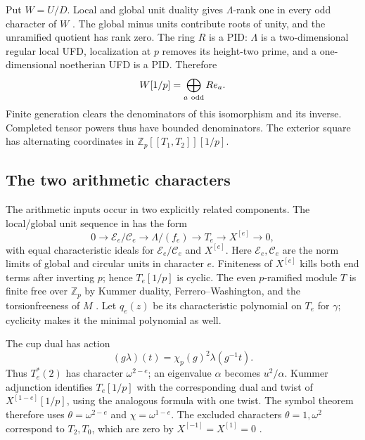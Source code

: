 \documentclass[11pt]{article}
\theoremstyle{definition}\newtheorem{definition}[theorem]{Definition}
\newcommand{\Z}{\mathbb Z}\newcommand{\Q}{\mathbb Q}
\begin{document}
Put $W=U/D$. Local and global unit duality gives $\Lambda$-rank
one in every odd character of $W$
\cite[Proposition~2.2.6 and its proof, pp.~3--4]{WWEOrd}.
The global minus units contribute roots of unity, and the
unramified quotient has rank zero. The ring $R$ is a PID:
$\Lambda$ is a two-dimensional regular local UFD, localization
at $p$ removes its height-two prime, and a one-dimensional
noetherian UFD is a PID. Therefore
\begin{equation}
                  W[1/p]=\bigoplus_{a\ {\rm odd}}Re_a .
                  \label{eq:Wfree}
\end{equation}
Finite generation clears the denominators of this isomorphism
and its inverse. Completed tensor powers thus have bounded
denominators. The exterior square has alternating coordinates
in $\Z_p[[T_1,T_2]][1/p]$.

\subsection{The two arithmetic characters}

The arithmetic inputs occur in two explicitly related components.
The local/global unit sequence in
\cite[Corollary~2.1.3, p.~8]{WWEPseudo} has the form
\begin{equation}
 0\longrightarrow\mathcal E_e/\mathcal C_e
 \longrightarrow\Lambda/(f_e)\longrightarrow T_e
 \longrightarrow X^{[e]}\longrightarrow0 ,
 \label{eq:unitseq}
\end{equation}
with equal characteristic ideals for $\mathcal E_e/\mathcal C_e$
and $X^{[e]}$. Here $\mathcal E_e,\mathcal C_e$ are the norm limits
of global and circular units in character $e$.
Finiteness of $X^{[e]}$ kills both end terms after inverting $p$;
hence $T_e[1/p]$ is cyclic.
The even $p$-ramified module $T$ is finite free over $\Z_p$ by
Kummer duality, Ferrero--Washington, and the torsionfreeness of $M$
\cite[Proposition~3.4.7 and Corollary~3.4.8, p.~92]{SharifiIwa}.
Let $q_e(z)$ be its characteristic polynomial on $T_e$ for
$\gamma$; cyclicity makes it the minimal polynomial as well.

The cup dual has action
\begin{equation}
 (g\lambda)(t)=\chi_p(g)^2\lambda(g^{-1}t).
 \label{eq:twodual}
\end{equation}
Thus $T_e^*(2)$ has character $\omega^{2-e}$; an eigenvalue
$\alpha$ becomes $u^2/\alpha$. Kummer adjunction identifies
$T_e[1/p]$ with the corresponding dual and twist of
$X^{[1-e]}[1/p]$, using the analogous formula with one twist.
The symbol theorem therefore uses
$\theta=\omega^{2-e}$ and $\chi=\omega^{1-e}$.
The excluded characters $\theta=1,\omega^2$ correspond to
$T_2,T_0$, which are zero by $X^{[-1]}=X^{[1]}=0$
\cite[proof of Lemma~5.2.7, p.~13]{WWEOrd}.
\end{document}

